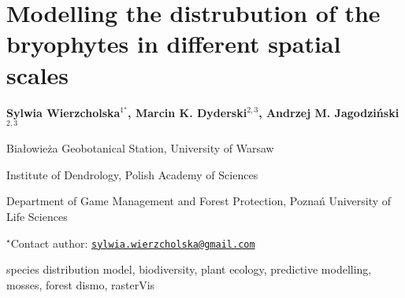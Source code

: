 \documentclass[\main/boa.tex]{subfiles}
\begin{document}
\pagestyle{empty}

\section{Modelling the distrubution of the bryophytes in different spatial scales}

\begin{center}
  {\bf Sylwia Wierzcholska$^{1^\star}$, Marcin K. Dyderski$^{2, 3}$, Andrzej M. Jagodziński$^{2, 3}$}
\end{center}

\vskip 0.3cm

\begin{affiliations}
\begin{enumerate}
\begin{minipage}{0.915\textwidth}
\centering
\item Białowieża Geobotanical Station, University of Warsaw \\[-2pt]
\item Institute of Dendrology, Polish Academy of Sciences \\[-2pt]
\item Department of Game Management and Forest Protection, Poznań University
of Life Sciences \\[-2pt]
\end{minipage}
\end{enumerate}
$^\star$Contact author: \href{mailto:sylwia.wierzcholska@gmail.com}{\nolinkurl{sylwia.wierzcholska@gmail.com}}\\
\end{affiliations}

\vskip 0.5cm

\begin{minipage}{0.915\textwidth}
\keywords species distribution model, biodiversity, plant ecology, predictive
modelling, mosses, forest
\packages dismo, rasterVis
\end{minipage}

\vskip 0.8cm
\end{document}
